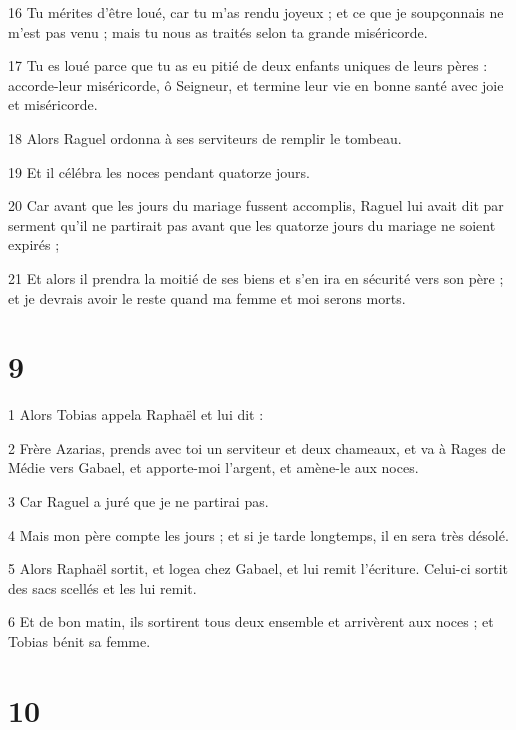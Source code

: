 \par 16 Tu mérites d'être loué, car tu m'as rendu joyeux ; et ce que je soupçonnais ne m'est pas venu ; mais tu nous as traités selon ta grande miséricorde.
\par 17 Tu es loué parce que tu as eu pitié de deux enfants uniques de leurs pères : accorde-leur miséricorde, ô Seigneur, et termine leur vie en bonne santé avec joie et miséricorde.
\par 18 Alors Raguel ordonna à ses serviteurs de remplir le tombeau.
\par 19 Et il célébra les noces pendant quatorze jours.
\par 20 Car avant que les jours du mariage fussent accomplis, Raguel lui avait dit par serment qu'il ne partirait pas avant que les quatorze jours du mariage ne soient expirés ;
\par 21 Et alors il prendra la moitié de ses biens et s'en ira en sécurité vers son père ; et je devrais avoir le reste quand ma femme et moi serons morts.

\chapter{9}

\par 1 Alors Tobias appela Raphaël et lui dit :
\par 2 Frère Azarias, prends avec toi un serviteur et deux chameaux, et va à Rages de Médie vers Gabael, et apporte-moi l'argent, et amène-le aux noces.
\par 3 Car Raguel a juré que je ne partirai pas.
\par 4 Mais mon père compte les jours ; et si je tarde longtemps, il en sera très désolé.
\par 5 Alors Raphaël sortit, et logea chez Gabael, et lui remit l'écriture. Celui-ci sortit des sacs scellés et les lui remit.
\par 6 Et de bon matin, ils sortirent tous deux ensemble et arrivèrent aux noces ; et Tobias bénit sa femme.

\chapter{10}

